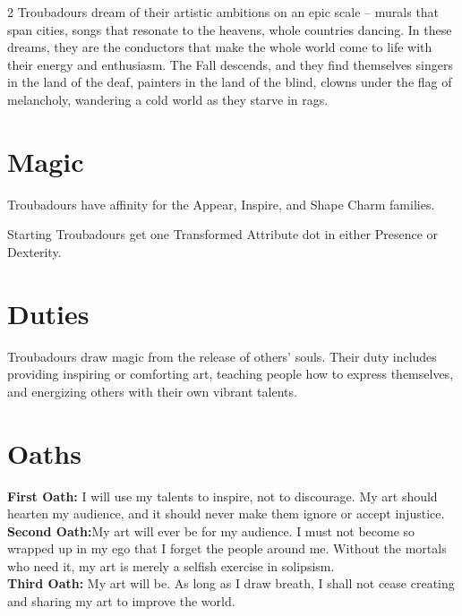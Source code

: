 \begin{multicols}{2}
Troubadours dream of their artistic ambitions on an epic scale – murals that span cities, songs that resonate to the heavens, whole countries dancing. In these dreams, they are the conductors that make the whole world come to life with their energy and enthusiasm. The Fall descends, and they find themselves singers in the land of the deaf, painters in the land of the blind, clowns under the flag of melancholy, wandering a cold world as they starve in rags. 

\section*{Magic}
Troubadours have affinity for the Appear, Inspire, and Shape Charm families.

Starting Troubadours get one Transformed Attribute dot in either Presence or Dexterity. 

\section*{Duties}
Troubadours draw magic from the release of others' souls. Their duty includes providing inspiring or comforting art, teaching people how to express themselves, and energizing others with their own vibrant talents. 
\section*{Oaths}
\noindent \textbf{First Oath:} I will use my talents to inspire, not to discourage. My art should hearten my audience, and it should never make them ignore or accept injustice. \\

\noindent \textbf{Second Oath:}My art will ever be for my audience. I must not become so wrapped up in my ego that I forget the people around me. Without the mortals who need it, my art is merely a selfish exercise in solipsism. \\

\noindent \textbf{Third Oath:} My art will be. As long as I draw breath, I shall not cease creating and sharing my art to improve the world.


\end{multicols}
